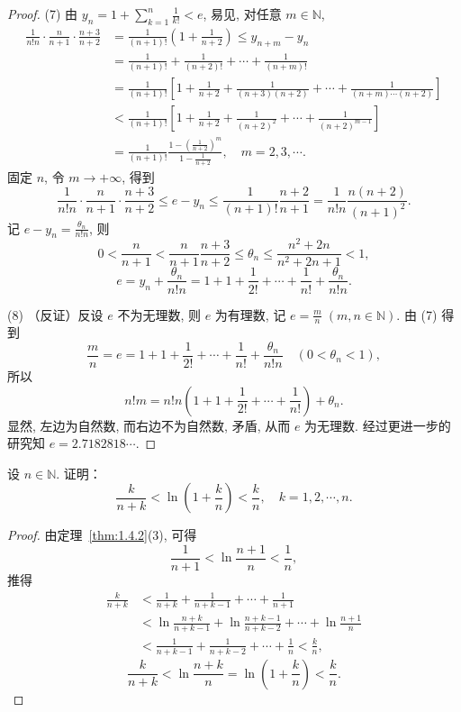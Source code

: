 \begin{proof}
(7) 由 $y_{n} = 1 + \sum\limits_{k=1}^{n}\frac{1}{k!} < e$, 易见, 对任意 $m \in \mathbb{N}$,
\[
\begin{aligned}
\frac{1}{n! n}\cdot\frac{n}{n+1}\cdot\frac{n+3}{n+2} &= \frac{1}{(n+1)!}\left(1 + \frac{1}{n+2}\right) \leqslant y_{n+m} - y_{n} \\
&= \frac{1}{(n+1)!} + \frac{1}{(n+2)!} + \cdots + \frac{1}{(n+m)!} \\
&= \frac{1}{(n+1)!}\left[1 + \frac{1}{n+2} + \frac{1}{(n+3)(n+2)} + \cdots + \frac{1}{(n+m)\cdots(n+2)}\right] \\
&< \frac{1}{(n+1)!}\left[1 + \frac{1}{n+2} + \frac{1}{(n+2)^2} + \cdots + \frac{1}{(n+2)^{m-1}}\right] \\
&= \frac{1}{(n+1)!}\frac{1 - \left(\frac{1}{n+2}\right)^m}{1 - \frac{1}{n+2}},\quad m=2,3,\cdots.
\end{aligned}
\]
固定 $n$, 令 $m \to +\infty$, 得到
\[
\frac{1}{n! n}\cdot\frac{n}{n+1}\cdot\frac{n+3}{n+2} \leqslant e - y_{n} \leqslant \frac{1}{(n+1)!}\frac{n+2}{n+1} = \frac{1}{n! n}\frac{n(n+2)}{(n+1)^{2}}.
\]
记 $e - y_{n} = \frac{\theta_{n}}{n! n}$, 则
\[
0 < \frac{n}{n+1} < \frac{n}{n+1}\frac{n+3}{n+2} \leqslant \theta_{n} \leqslant \frac{n^{2}+2n}{n^{2}+2n+1} < 1,
\]
\[
e = y_{n} + \frac{\theta_{n}}{n! n} = 1 + 1 + \frac{1}{2!} + \cdots + \frac{1}{n!} + \frac{\theta_{n}}{n! n}.
\]

(8) （反证）反设 $e$ 不为无理数, 则 $e$ 为有理数, 记 $e = \frac{m}{n}\;(m, n \in \mathbb{N})$. 由 (7) 得到
\[
\frac{m}{n} = e = 1 + 1 + \frac{1}{2!} + \cdots + \frac{1}{n!} + \frac{\theta_{n}}{n! n}\quad (0 < \theta_{n} < 1),
\]
所以
\[
n! m = n! n\left(1 + 1 + \frac{1}{2!} + \cdots + \frac{1}{n!}\right) + \theta_{n}.
\]
显然, 左边为自然数, 而右边不为自然数, 矛盾, 从而 $e$ 为无理数. 经过更进一步的研究知 $e = 2.7182818\cdots$.
\end{proof}

\begin{example}\label{ex:1.4.7}
设 $n \in \mathbb{N}$. 证明：
\[
\frac{k}{n+k} < \ln\left(1 + \frac{k}{n}\right) < \frac{k}{n},\quad k=1, 2, \cdots, n.
\]
\end{example}

\begin{proof}
由定理~\ref{thm:1.4.2}(3), 可得
\[
\frac{1}{n+1} < \ln\frac{n+1}{n} < \frac{1}{n},
\]
推得
\[
\begin{aligned}
\frac{k}{n+k} &< \frac{1}{n+k} + \frac{1}{n+k-1} + \cdots + \frac{1}{n+1} \\
&< \ln\frac{n+k}{n+k-1} + \ln\frac{n+k-1}{n+k-2} + \cdots + \ln\frac{n+1}{n} \\
&< \frac{1}{n+k-1} + \frac{1}{n+k-2} + \cdots + \frac{1}{n} < \frac{k}{n},
\end{aligned}
\]
\[
\frac{k}{n+k} < \ln\frac{n+k}{n} = \ln\left(1 + \frac{k}{n}\right) < \frac{k}{n}.
\]
\end{proof}

